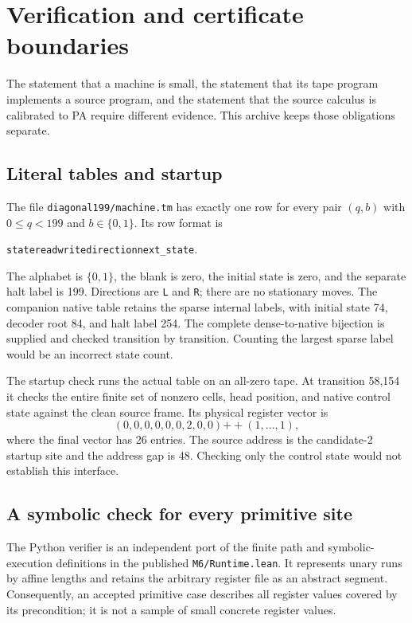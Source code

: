 \section{Verification and certificate boundaries}\label{sec:verification}
The statement that a machine is small, the statement that its tape program implements a source program, and the statement that the source calculus is calibrated to PA require different evidence. This archive keeps those obligations separate.

\subsection{Literal tables and startup}
The file \texttt{diagonal199/machine.tm} has exactly one row for every pair \((q,b)\) with \(0\leq q<199\) and \(b\in\{0,1\}\). Its row format is
\begin{center}\texttt{state\quad read\quad write\quad direction\quad next\_state}.\end{center}
The alphabet is \(\{0,1\}\), the blank is zero, the initial state is zero, and the separate halt label is 199. Directions are \texttt{L} and \texttt{R}; there are no stationary moves. The companion native table retains the sparse internal labels, with initial state 74, decoder root 84, and halt label 254. The complete dense-to-native bijection is supplied and checked transition by transition. Counting the largest sparse label would be an incorrect state count.

The startup check runs the actual table on an all-zero tape. At transition 58,154 it checks the entire finite set of nonzero cells, head position, and native control state against the clean source frame. Its physical register vector is
\[
 (0,0,0,0,0,0,2,0,0)\mathbin{+\!+}(1,\ldots,1),
\]
where the final vector has 26 entries. The source address is the candidate-2 startup site and the address gap is 48. Checking only the control state would not establish this interface.

\subsection{A symbolic check for every primitive site}
The Python verifier is an independent port of the finite path and symbolic-execution definitions in the published \texttt{M6/Runtime.lean}. It represents unary runs by affine lengths and retains the arbitrary register file as an abstract segment. Consequently, an accepted primitive case describes all register values covered by its precondition; it is not a sample of small concrete register values.

